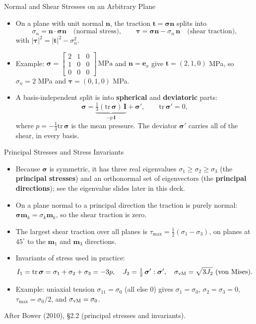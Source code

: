 \documentclass[aspectratio=169,11pt]{beamer}
\begin{document}
\begin{frame}{Normal and Shear Stresses on an Arbitrary Plane}
\begin{itemize}
\item On a plane with unit normal $\mathbf{n}$, the traction $\mathbf{t}=\boldsymbol{\sigma}\mathbf{n}$ splits into
\[
\sigma_n = \mathbf{n}\cdot\boldsymbol{\sigma}\mathbf{n} \quad\text{(normal stress)},\qquad
\boldsymbol{\tau} = \boldsymbol{\sigma}\mathbf{n} - \sigma_n\,\mathbf{n} \quad\text{(shear traction)},
\]
with $|\boldsymbol{\tau}|^2 = |\mathbf{t}|^2 - \sigma_n^2$.
\item Example: $\boldsymbol{\sigma}=\begin{bmatrix}2&1&0\\1&0&0\\0&0&0\end{bmatrix}\,\text{MPa}$ and $\mathbf{n}=\mathbf{e}_x$ give $\mathbf{t}=(2,1,0)$ MPa, so $\sigma_n=2$ MPa and $\boldsymbol{\tau}=(0,1,0)$ MPa.
\item A basis-independent split is into \textbf{spherical} and \textbf{deviatoric} parts:
\[
\boldsymbol{\sigma} = \underbrace{\tfrac13(\mathrm{tr}\,\boldsymbol{\sigma})\,\mathbf{I}}_{-p\,\mathbf{I}} + \boldsymbol{\sigma}', \qquad \mathrm{tr}\,\boldsymbol{\sigma}'=0,
\]
where $p=-\tfrac13\mathrm{tr}\,\boldsymbol{\sigma}$ is the mean pressure. The deviator $\boldsymbol{\sigma}'$ carries all of the shear, in every basis.
\end{itemize}
\end{frame}

\begin{frame}{Principal Stresses and Stress Invariants}
\begin{itemize}
\item Because $\boldsymbol{\sigma}$ is symmetric, it has three real eigenvalues $\sigma_1\ge\sigma_2\ge\sigma_3$ (the \textbf{principal stresses}) and an orthonormal set of eigenvectors (the \textbf{principal directions}); see the eigenvalue slides later in this deck.
\item On a plane normal to a principal direction the traction is purely normal: $\boldsymbol{\sigma}\mathbf{m}_k=\sigma_k\mathbf{m}_k$, so the shear traction is zero.
\item The largest shear traction over all planes is $\tau_{\max}=\tfrac12(\sigma_1-\sigma_3)$, on planes at $45^\circ$ to the $\mathbf{m}_1$ and $\mathbf{m}_3$ directions.
\item Invariants of stress used in practice:
\[
I_1=\mathrm{tr}\,\boldsymbol{\sigma}=\sigma_1+\sigma_2+\sigma_3=-3p,\quad
J_2=\tfrac12\,\boldsymbol{\sigma}':\boldsymbol{\sigma}',\quad
\sigma_{\rm vM}=\sqrt{3J_2}\ \text{(von Mises)} .
\]
\item Example: uniaxial tension $\sigma_{11}=\sigma_0$ (all else 0) gives $\sigma_1=\sigma_0$, $\sigma_2=\sigma_3=0$, $\tau_{\max}=\sigma_0/2$, and $\sigma_{\rm vM}=\sigma_0$.
\end{itemize}
\vspace{1mm}
{\tiny\color{DarkGray}After Bower (2010), \S2.2 (principal stresses and invariants).\par}
\end{frame}
\end{document}
